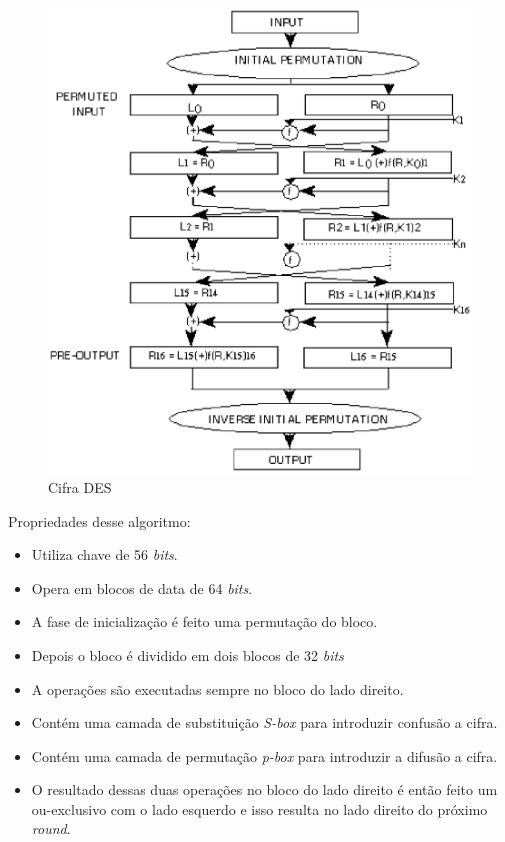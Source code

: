 \begin{figure}[h]
	\centering
	\includegraphics[scale=0.5]
		{figuras/des_cipher.eps}
		\caption[Cifra \textit{DES}]{Cifra DES\protect\footnotemark} 
\end{figure}

Propriedades desse algoritmo:

\begin{itemize}
	\item Utiliza chave de 56 \textit{bits}.
	\item Opera em blocos de data de 64 \textit{bits}.
	\item A fase de inicialização é feito uma permutação do bloco.
	\item Depois o bloco é dividido em dois blocos de 32 \textit{bits}
	\item A operações são executadas sempre no bloco do lado direito.
	\item Contém uma camada de substituição \textit{S-box} para introduzir confusão a cifra.
	\item Contém uma camada de permutação \textit{p-box} para introduzir a difusão a cifra.
	\item O resultado dessas duas operações no bloco do lado direito é então feito um ou-exclusivo com o lado esquerdo e isso resulta no lado direito do próximo \textit{round}.
\end{itemize}

